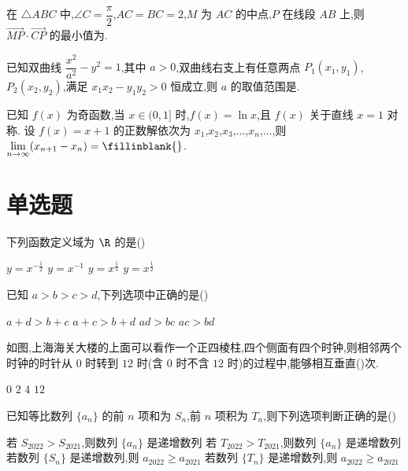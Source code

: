 \begin{problem}
在 \(\triangle ABC\) 中,\(\angle C=\dfrac\pi2\),\(AC=BC=2\),\(M\) 为 \(AC\) 的中点,\(P\) 在线段 \(AB\) 上,则 \(\overrightarrow{MP}\cdot\overrightarrow{CP}\) 的最小值为\fillinblank{}.
\end{problem}

\begin{problem}
已知双曲线 \(\dfrac{x^2}{a^2}-y^2=1\),其中 \(a>0\),双曲线右支上有任意两点 \(P_1(x_1,y_1)\),\(P_2(x_2,y_2)\),满足 \(x_1x_2-y_1y_2>0\) 恒成立,则 \(a\) 的取值范围是\fillinblank{}.
\end{problem}

\begin{problem}
已知 \(f(x)\) 为奇函数,当 \(x\in(0,1]\) 时,\(f(x)=\ln x\),且 \(f(x)\) 关于直线 \(x=1\) 对称. 设 \(f(x)=x+1\) 的正数解依次为 \(x_1\),\(x_2\),\(x_3\),\(\ldots\),\(x_n\),\(\ldots\),则 \(\displaystyle\lim_{n\to\infty}(x_{n+1}-x_n)=\fillinblank{}\).
\end{problem}

\section{单选题}

\begin{problem}
下列函数定义域为 \(\R\) 的是(\quad)

\choices
    {\(y=x^{-\frac12}\)}
    {\(y=x^{-1}\)}
    {\(y=x^{\frac13}\)}
    {\(y=x^{\frac12}\)}
\end{problem}

\begin{problem}
已知 \(a>b>c>d\),下列选项中正确的是(\quad)

\choices
    {\(a+d>b+c\)}
    {\(a+c>b+d\)}
    {\(ad>bc\)}
    {\(ac>bd\)}
\end{problem}

\begin{problem}
如图,上海海关大楼的上面可以看作一个正四棱柱,四个侧面有四个时钟,则相邻两个时钟的时针从 \(0\) 时转到 \(12\) 时(含 \(0\) 时不含 \(12\) 时)的过程中,能够相互垂直(\quad)次.


\choices
    {\(0\)}
    {\(2\)}
    {\(4\)}
    {\(12\)}
\end{problem}

\begin{problem}
已知等比数列 \(\{a_n\}\) 的前 \(n\) 项和为 \(S_n\),前 \(n\) 项积为 \(T_n\),则下列选项判断正确的是(\quad)

\choices
    {若 \(S_{2022}>S_{2021}\),则数列 \(\{a_n\}\) 是递增数列}
    {若 \(T_{2022}>T_{2021}\),则数列 \(\{a_n\}\) 是递增数列}
    {若数列 \(\{S_n\}\) 是递增数列,则 \(a_{2022}\ge a_{2021}\)}
    {若数列 \(\{T_n\}\) 是递增数列,则 \(a_{2022}\ge a_{2021}\)}
\end{problem}

